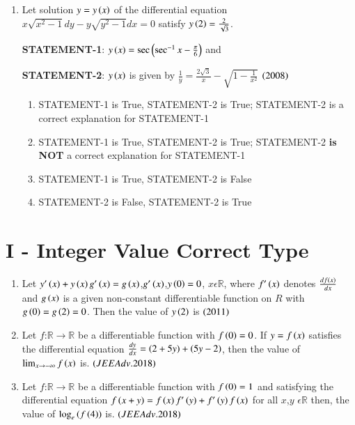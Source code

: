 \documentclass[journal,12pt,twocolumn]{IEEEtran}
\theoremstyle{remark}
\begin{document}
\begin{enumerate}
\item Let solution $y=y\left(x\right)$ of the differential equation $x\sqrt{x^2-1}dy-y\sqrt{y^2-1}dx=0$ satisfy $y\left(2\right)=\frac{2}{\sqrt3}$.

	\textbf{STATEMENT-1}: $y\left(x\right)=\sec{\ensuremath{\left(\sec^{-1}{x}-\frac{\pi}{6}\right)}}$ and 

\textbf{STATEMENT-2}: $y\left(x\right)$ is given by $\frac{1}{y}=\frac{2\sqrt3}{x}-\sqrt{1-\frac{1}{x^2}}$
$\hfill{\brak{2008}}$
\begin{enumerate}
\item STATEMENT-1 is True, STATEMENT-2 is True; STATEMENT-2 is a correct explanation for STATEMENT-1
\item STATEMENT-1 is True, STATEMENT-2 is True; STATEMENT-2 \textbf{is NOT} a correct explanation for STATEMENT-1
\item STATEMENT-1 is True, STATEMENT-2 is False
\item STATEMENT-2 is False, STATEMENT-2 is True
\end{enumerate}
\end{enumerate}

\section{I - Integer Value Correct Type}

\begin{enumerate}
	\item Let $y^{\prime}\left(x\right)+y\left(x\right)g^{\prime}\left(x\right)=g\left(x\right)$,$g^{\prime}\left(x\right)$,$y\left(0\right)=0$, $x\epsilon\mathbb{R}$, where $f^{\prime}\left(x\right)$ denotes $\frac{{df\left(x\right)}}{dx}$ and $g\left(x\right)$ is a given non-constant differentiable function on $R$ with $g\left(0\right)=g\left(2\right)=0$. Then the value of $y\left(2\right)$ is 
		$\hfill{\brak{2011}}$

\item Let $f$:$\mathbb{R}\to\mathbb{R}$ be a differentiable function with $f\left(0\right)=0$. If $y=f\left(x\right)$ satisfies the differential equation $\frac{dy}{dx}=\left(2+5y\right)+\left(5y-2\right)$, then the value of $\lim_{x\to-\infty}f\left(x\right)$ is. 
	$\hfill{\brak{JEE Adv. 2018}}$

	\item Let $f$:$\mathbb{R}\to\mathbb{R}$ be a differentiable function with $f\left(0\right)=1$ and satisfying the differential equation $f\left(x+y\right)=f\left(x\right)f^{\prime}\left(y\right)+f^{\prime}\left(y\right)f\left(x\right)$ for all $x$,$y$ $\epsilon \mathbb{R}$ then, the value of $\log_e \left(f\left(4\right)\right)$ is. 
		$\hfill{\brak{JEE Adv. 2018}}$

\end{enumerate}
\end{document}
